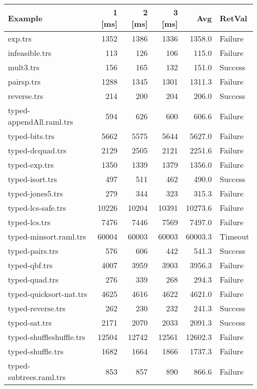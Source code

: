 \documentclass[11pt]{article}
\begin{document}
\begin{center}
\begin{tabular}{lrrrrl}
\hline
Example & 1 [ms] & 2 [ms] & 3 [ms] & Avg & RetVal\\
\hline
exp.trs & 1352 & 1386 & 1336 & 1358.0 & Failure\\
infeasible.trs & 113 & 126 & 106 & 115.0 & Failure\\
mult3.trs & 156 & 165 & 132 & 151.0 & Success\\
pairsp.trs & 1288 & 1345 & 1301 & 1311.3 & Failure\\
reverse.trs & 214 & 200 & 204 & 206.0 & Success\\
typed-appendAll.raml.trs & 594 & 626 & 600 & 606.6 & Failure\\
typed-bits.trs & 5662 & 5575 & 5644 & 5627.0 & Failure\\
typed-dcquad.trs & 2129 & 2505 & 2121 & 2251.6 & Failure\\
typed-exp.trs & 1350 & 1339 & 1379 & 1356.0 & Failure\\
typed-isort.trs & 497 & 511 & 462 & 490.0 & Success\\
typed-jones5.trs & 279 & 344 & 323 & 315.3 & Failure\\
typed-lcs-safe.trs & 10226 & 10204 & 10391 & 10273.6 & Failure\\
typed-lcs.trs & 7476 & 7446 & 7569 & 7497.0 & Failure\\
typed-minsort.raml.trs & 60004 & 60003 & 60003 & 60003.3 & Timeout\\
typed-pairs.trs & 576 & 606 & 442 & 541.3 & Success\\
typed-qbf.trs & 4007 & 3959 & 3903 & 3956.3 & Failure\\
typed-quad.trs & 276 & 339 & 268 & 294.3 & Failure\\
typed-quicksort-nat.trs & 4625 & 4616 & 4622 & 4621.0 & Failure\\
typed-reverse.trs & 262 & 230 & 232 & 241.3 & Success\\
typed-sat.trs & 2171 & 2070 & 2033 & 2091.3 & Success\\
typed-shuffleshuffle.trs & 12504 & 12742 & 12561 & 12602.3 & Failure\\
typed-shuffle.trs & 1682 & 1664 & 1866 & 1737.3 & Failure\\
typed-subtrees.raml.trs & 853 & 857 & 890 & 866.6 & Failure\\
\hline
\end{tabular}

\end{center}
\end{document}
